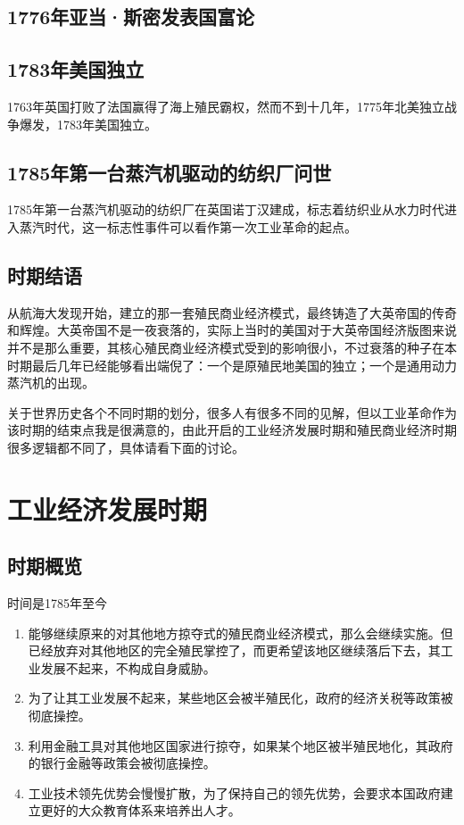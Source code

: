\documentclass[12pt,oneside]{book}
\begin{document}
\chapter{1776年亚当·斯密发表国富论}




\chapter{1783年美国独立}
1763年英国打败了法国赢得了海上殖民霸权，然而不到十几年，1775年北美独立战争爆发，1783年美国独立。


\chapter{1785年第一台蒸汽机驱动的纺织厂问世}
1785年第一台蒸汽机驱动的纺织厂在英国诺丁汉建成，标志着纺织业从水力时代进入蒸汽时代，这一标志性事件可以看作第一次工业革命的起点。


\chapter{时期结语}
从航海大发现开始，建立的那一套殖民商业经济模式，最终铸造了大英帝国的传奇和辉煌。大英帝国不是一夜衰落的，实际上当时的美国对于大英帝国经济版图来说并不是那么重要，其核心殖民商业经济模式受到的影响很小，不过衰落的种子在本时期最后几年已经能够看出端倪了：一个是原殖民地美国的独立；一个是通用动力蒸汽机的出现。

关于世界历史各个不同时期的划分，很多人有很多不同的见解，但以工业革命作为该时期的结束点我是很满意的，由此开启的工业经济发展时期和殖民商业经济时期很多逻辑都不同了，具体请看下面的讨论。



\part{工业经济发展时期}
\chapter{时期概览}
时间是1785年至今


\begin{enumerate}
\item 能够继续原来的对其他地方掠夺式的殖民商业经济模式，那么会继续实施。但已经放弃对其他地区的完全殖民掌控了，而更希望该地区继续落后下去，其工业发展不起来，不构成自身威胁。
\item 为了让其工业发展不起来，某些地区会被半殖民化，政府的经济关税等政策被彻底操控。
\item 利用金融工具对其他地区国家进行掠夺，如果某个地区被半殖民地化，其政府的银行金融等政策会被彻底操控。
\item 工业技术领先优势会慢慢扩散，为了保持自己的领先优势，会要求本国政府建立更好的大众教育体系来培养出人才。
\end{enumerate}
\end{document}

